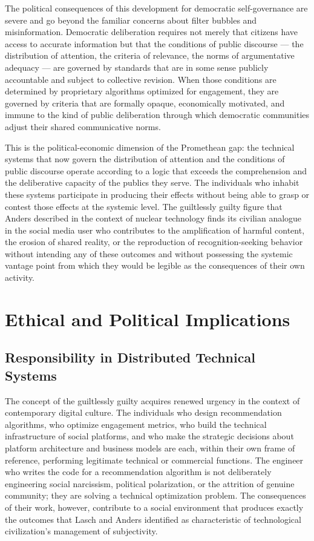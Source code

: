 \documentclass[12pt]{memoir}
\begin{document}
The political consequences of this development for democratic self-governance are
severe and go beyond the familiar concerns about filter bubbles and misinformation.
Democratic deliberation requires not merely that citizens have access to accurate
information but that the conditions of public discourse — the distribution of
attention, the criteria of relevance, the norms of argumentative adequacy — are
governed by standards that are in some sense publicly accountable and subject to
collective revision. When those conditions are determined by proprietary algorithms
optimized for engagement, they are governed by criteria that are formally opaque,
economically motivated, and immune to the kind of public deliberation through which
democratic communities adjust their shared communicative norms.

This is the political-economic dimension of the Promethean gap: the technical systems
that now govern the distribution of attention and the conditions of public discourse
operate according to a logic that exceeds the comprehension and the deliberative
capacity of the publics they serve. The individuals who inhabit these systems
participate in producing their effects without being able to grasp or contest those
effects at the systemic level. The guiltlessly guilty figure that Anders described in
the context of nuclear technology finds its civilian analogue in the social media user
who contributes to the amplification of harmful content, the erosion of shared reality,
or the reproduction of recognition-seeking behavior without intending any of these
outcomes and without possessing the systemic vantage point from which they would
be legible as the consequences of their own activity.

\section{Ethical and Political Implications}
\label{sec:ethics}

\subsection{Responsibility in Distributed Technical Systems}

The concept of the guiltlessly guilty acquires renewed urgency in the context of contemporary
digital culture. The individuals who design recommendation algorithms, who optimize engagement
metrics, who build the technical infrastructure of social platforms, and who make the strategic
decisions about platform architecture and business models are each, within their own frame of
reference, performing legitimate technical or commercial functions. The engineer who writes the
code for a recommendation algorithm is not deliberately engineering social narcissism, political
polarization, or the attrition of genuine community; they are solving a technical optimization
problem. The consequences of their work, however, contribute to a social environment that
produces exactly the outcomes that Lasch and Anders identified as characteristic of technological
civilization's management of subjectivity.
\end{document}
